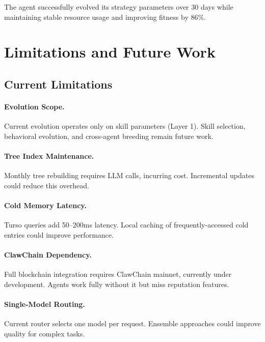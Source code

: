 \documentclass{article}
\begin{document}
The agent successfully evolved its strategy parameters over 30 days while maintaining stable resource usage and improving fitness by 86\%.



\section{Limitations and Future Work}
\label{sec:limitations}

\subsection{Current Limitations}

\paragraph{Evolution Scope.} Current evolution operates only on skill parameters (Layer 1). Skill selection, behavioral evolution, and cross-agent breeding remain future work.

\paragraph{Tree Index Maintenance.} Monthly tree rebuilding requires LLM calls, incurring cost. Incremental updates could reduce this overhead.

\paragraph{Cold Memory Latency.} Turso queries add 50--200ms latency. Local caching of frequently-accessed cold entries could improve performance.

\paragraph{ClawChain Dependency.} Full blockchain integration requires ClawChain mainnet, currently under development. Agents work fully without it but miss reputation features.

\paragraph{Single-Model Routing.} Current router selects one model per request. Ensemble approaches could improve quality for complex tasks.
\end{document}
